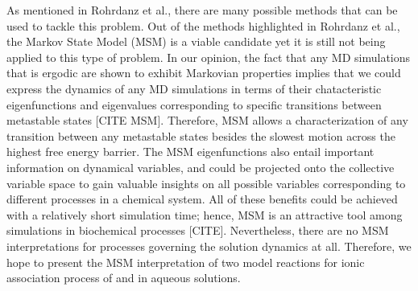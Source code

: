 \begin{spacing}{2.0}
    As mentioned in Rohrdanz et al., there are many possible methods that can be used to tackle this problem. \cite{P-AnnuRevPhysChem-2013-v64-Rohrdanz} 
    Out of the methods highlighted in Rohrdanz et al., the Markov State Model (MSM) is a viable candidate yet it is still not being applied to this 
    type of problem. In our opinion, the fact that any MD simulations that is ergodic are shown to exhibit Markovian properties \cite{P-JStatPhys-1983-v30-Zwanzig} 
    implies that we could express the dynamics of any MD simulations in terms of their chatacteristic eigenfunctions and eigenvalues corresponding 
    to specific transitions between metastable states [CITE MSM]. Therefore, MSM allows a characterization of any transition between any metastable 
    states besides the slowest motion across the highest free energy barrier. The MSM eigenfunctions also entail important information on dynamical 
    variables, and could be projected onto the collective variable space to gain valuable insights on all possible variables corresponding to 
    different processes in a chemical system. All of these benefits could be achieved with a relatively short simulation time; hence, MSM is an 
    attractive tool among simulations in biochemical processes [CITE]. Nevertheless, there are no MSM interpretations for processes governing the 
    solution dynamics at all. Therefore, we hope to present the MSM interpretation of two model reactions for ionic association process of 
     and  in aqueous solutions.
\end{spacing}
